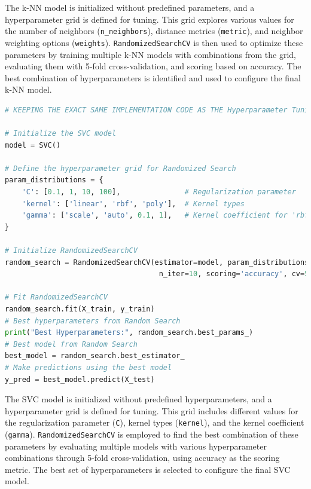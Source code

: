 \noindent
The k-NN model is initialized without predefined parameters, and a hyperparameter grid is defined for tuning. This grid explores various values for the number of neighbors (\texttt{n\_neighbors}), distance metrics (\texttt{metric}), and neighbor weighting options (\texttt{weights}). \texttt{RandomizedSearchCV} is then used to optimize these parameters by training multiple k-NN models with combinations from the grid, evaluating them with 5-fold cross-validation, and scoring based on accuracy. The best combination of hyperparameters is identified and used to configure the final k-NN model.


\begin{tcolorbox}[colback=gray!5!white, colframe=gray!80!black, boxrule=0.5pt, title=Support Vector Machine]
    \begin{lstlisting}[language=Python]
# KEEPING THE EXACT SAME IMPLEMENTATION CODE AS THE Hyperparameter Tuning ON LOGISTIC REGRESSION

# Initialize the SVC model
model = SVC()

# Define the hyperparameter grid for Randomized Search
param_distributions = {
    'C': [0.1, 1, 10, 100],               # Regularization parameter
    'kernel': ['linear', 'rbf', 'poly'],  # Kernel types
    'gamma': ['scale', 'auto', 0.1, 1],   # Kernel coefficient for 'rbf', 'poly', and 'sigmoid'
}

# Initialize RandomizedSearchCV
random_search = RandomizedSearchCV(estimator=model, param_distributions=param_distributions,
                                    n_iter=10, scoring='accuracy', cv=5, n_jobs=-1, random_state=42)

# Fit RandomizedSearchCV
random_search.fit(X_train, y_train)
# Best hyperparameters from Random Search
print("Best Hyperparameters:", random_search.best_params_)
# Best model from Random Search
best_model = random_search.best_estimator_
# Make predictions using the best model
y_pred = best_model.predict(X_test)
\end{lstlisting}
\end{tcolorbox}

\noindent
The SVC model is initialized without predefined hyperparameters, and a hyperparameter grid is defined for tuning. This grid includes different values for the regularization parameter (\texttt{C}), kernel types (\texttt{kernel}), and the kernel coefficient (\texttt{gamma}). \texttt{RandomizedSearchCV} is employed to find the best combination of these parameters by evaluating multiple models with various hyperparameter combinations through 5-fold cross-validation, using accuracy as the scoring metric. The best set of hyperparameters is selected to configure the final SVC model. 

